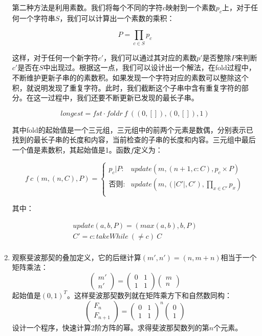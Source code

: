 \documentclass[UTF8]{article}
\begin{document}
\begin{enumerate}
第二种方法是利用素数。我们将每个不同的字符$c$映射到一个素数$p_c$上，对于任何一个字符串$S$，我们可以计算出一个素数的乘积：

\[
P = \displaystyle \prod_{c \in S} p_c
\]

这样，对于任何一个新字符$c'$，我们可以通过其对应的素数$p'$是否整除$P$来判断$c'$是否在$S$中出现过。根据这一点，我们可以设计出一个解法，在fold过程中，不断维护更新子串的的素数积。如果发现一个字符对应的素数可以整除这个积，就说明发现了重复字符。此时，我们截断这个子串中含有重复字符的部分。在这一过程中，我们还要不断更新已发现的最长子串。

\[
longest = fst \cdot foldr\ f\ ((0, []), (0, []), 1)
\]

其中fold的起始值是一个三元组，三元组中的前两个元素是数偶，分别表示已找到的最长子串的长度和内容，当前检查的子串的长度和内容。三元组中最后一个值是素数积，其起始值是1。函数$f$定义为：

\[
f\ c\ (m, (n, C), P) = \begin{cases}
  p_c | P : & update(m, (n + 1, c : C), p_c \times P) \\
  \text{否则}: & update(m, (|C'|, C'), \displaystyle \prod_{x \in C'} p_x) \\
\end{cases}
\]

其中：

\[ \begin{array}{l}
update(a, b, P) = (max(a, b), b, P) \\
C' = c : takeWhile\ (\neq c)\ C \\
\end{array} \]

\item 观察斐波那契的叠加定义，它的后继计算$(m', n') = (n, m + n)$相当于一个矩阵乘法：
\[
\begin{pmatrix} m' \\ n' \end{pmatrix} =
\begin{pmatrix} 0 & 1 \\ 1 & 1 \end{pmatrix}
\begin{pmatrix} m \\ n \end{pmatrix}
\]
起始值是$(0, 1)^T$。这样斐波那契数列就在矩阵乘方下和自然数同构：
\[
\begin{pmatrix}F_n \\ F_{n+1} \end{pmatrix} = \begin{pmatrix} 0 & 1 \\ 1 & 1 \end{pmatrix}^n\begin{pmatrix} 0 \\ 1 \end{pmatrix}
\]
设计一个程序，快速计算2阶方阵的幂。求得斐波那契数列的第$n$个元素。


\end{enumerate}
\end{document}
